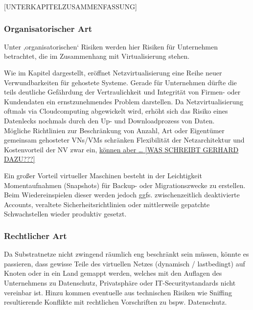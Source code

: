 [UNTERKAPITELZUSAMMENFASSUNG]


\subsubsection{Organisatorischer Art}
\label{subsubsec:gefahren_virt_organisatorisch}
Unter ‚organisatorischen‘ Risiken werden hier Risiken für Unternehmen betrachtet, die im Zusammenhang mit Virtualisierung stehen.

Wie im Kapitel  dargestellt, eröffnet Netzvirtualisierung eine Reihe neuer Verwundbarkeiten für gehostete Systeme. Gerade für Unternehmen dürfte die teils deutliche Gefährdung der Vertraulichkeit und Integrität von Firmen- oder Kundendaten ein ernstzunehmendes Problem darstellen. Da Netzvirtualisierung oftmals via Cloudcomputing abgewickelt wird, erhöht sich das Risiko eines Datenlecks nochmals durch den Up- und Downloadprozess von Daten.\\
Mögliche Richtlinien zur Beschränkung von Anzahl, Art oder Eigentümer gemeinsam gehosteter VNs/VMs schränken Flexibilität der Netzarchitektur und Kostenvorteil der NV zwar ein, \underline{können aber … [WAS SCHREIBT GERHARD DAZU???]}

Ein großer Vorteil virtueller Maschinen besteht in der Leichtigkeit Momentaufnahmen (Snapshots) für Backup- oder Migrationszwecke zu erstellen. Beim Wiedereinspielen dieser werden jedoch ggfs. zwischenzeitlich deaktivierte Accounts, veraltete Sicherheitsrichtlinien oder mittlerweile gepatchte Schwachstellen wieder produktiv gesetzt.
\cite{garfinkel2005virtual}





\subsubsection{Rechtlicher Art}
\label{subsubsec:gefahren_virt_rechtlich}
Da Substratnetze nicht zwingend räumlich eng beschränkt sein müssen, könnte es passieren, dass gewisse Teile des virtuellen Netzes (dynamisch / lastbedingt) auf Knoten oder in ein Land gemappt werden, welches mit den Auflagen des Unternehmens zu Datenschutz, Privatsphäre oder IT-Securitystandards nicht vereinbar ist. 
Hinzu kommen eventuelle aus technischen Risiken wie Sniffing resultierende Konflikte mit rechtlichen Vorschriften zu bspw. Datenschutz.
